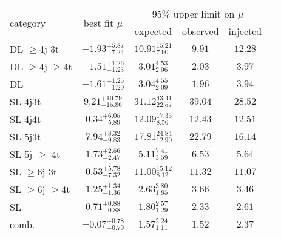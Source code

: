 \begin{tabular}{l|c|cccc}
\hline
\multirow{2}{*}{category} & \multirow{2}{*}{best fit $\mu$} & \multicolumn{3}{c}{95\% upper limit on $\mu$}\\
 & & expected & observed & injected \\
\hline
DL $\geq$4j 3t & $-1.93^{+5.87}_{-7.24}$ & $10.91^{15.21}_{7.90}$ & $9.91$ & $12.28$ \\
DL $\geq$4j $\geq$4t & $-1.51^{+1.26}_{-1.23}$ & $3.01^{4.53}_{2.06}$ & $2.03$ & $3.97$ \\
\hline
DL & $-1.61^{+1.25}_{-1.20}$ & $3.04^{4.55}_{2.09}$ & $1.96$ & $3.94$ \\
\hline
SL 4j3t & $9.21^{+10.79}_{-15.86}$ & $31.12^{43.41}_{22.57}$ & $39.04$ & $28.52$ \\
SL 4j4t & $0.34^{+6.05}_{-5.89}$ & $12.09^{17.35}_{8.56}$ & $12.43$ & $12.51$ \\
SL 5j3t & $7.94^{+8.32}_{-9.83}$ & $17.81^{24.84}_{12.90}$ & $22.79$ & $16.14$ \\
SL 5j $\geq$ 4t & $1.73^{+2.56}_{-2.47}$ & $5.11^{7.41}_{3.59}$ & $6.53$ & $5.64$ \\
SL $\geq$6j $3$t & $0.53^{+5.78}_{-7.32}$ & $11.00^{15.12}_{8.12}$ & $11.32$ & $11.07$ \\
SL $\geq$6j $\geq$4t & $1.25^{+1.34}_{-1.36}$ & $2.63^{3.80}_{1.85}$ & $3.66$ & $3.46$ \\
\hline
SL & $0.71^{+0.88}_{-0.88}$ & $1.80^{2.57}_{1.29}$ & $2.33$ & $2.61$ \\
\hline
comb. & $-0.07^{+0.78}_{-0.79}$ & $1.57^{2.24}_{1.11}$ & $1.52$ & $2.37$ \\
\hline
\hline
\end{tabular}